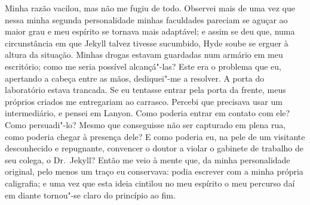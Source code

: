 Minha razão vacilou, mas não me fugiu de todo.  Observei mais de uma vez
que nessa minha segunda personalidade minhas faculdades pareciam se
aguçar ao maior grau e meu espírito se tornava mais adaptável; e assim
se deu que, numa circunstância em que Jekyll talvez tivesse sucumbido,
Hyde soube se erguer à altura da situação.  Minhas drogas estavam
guardadas num armário em meu escritório; como me seria possível
alcançá"-las?  Este era o problema que eu, apertando a cabeça entre as
mãos, dediquei"-me a resolver.  A porta do laboratório estava trancada. 
Se eu tentasse entrar pela porta da frente, meus próprios criados me
entregariam ao carrasco.  Percebi que precisava usar um intermediário,
e pensei em Lanyon.  Como poderia entrar em contato com ele?  Como
persuadi"-lo?  Mesmo que conseguisse não ser capturado em plena rua,
como poderia chegar à presença dele?  E como poderia eu, na pele de um
visitante desconhecido e repugnante, convencer o doutor a violar o
gabinete de trabalho de seu colega, o Dr.~Jekyll?  Então me veio à
mente que, da minha personalidade original, pelo menos um traço eu
conservava: podia escrever com a minha própria caligrafia; e uma vez
que esta ideia cintilou no meu espírito o meu percurso daí em diante
tornou"-se claro do princípio ao fim. 

